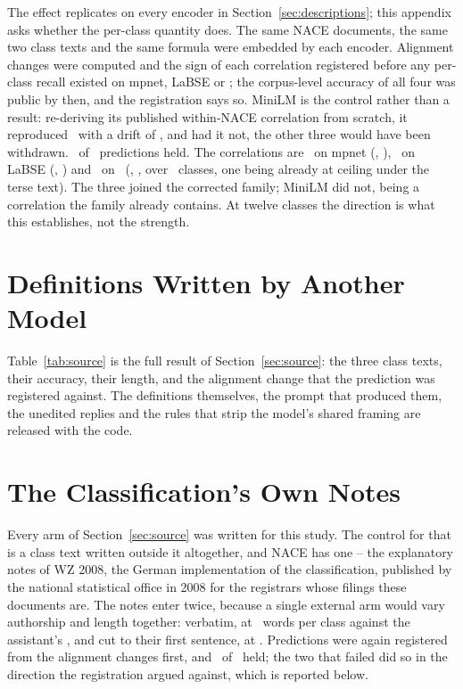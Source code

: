 \documentclass[11pt]{article}
\begin{document}
The effect replicates on every encoder in Section~\ref{sec:descriptions}; this
appendix asks whether the per-class quantity does. The same NACE documents,
the same two class texts and the same formula were embedded by each encoder.
Alignment changes were computed and the sign of each correlation registered
before any per-class recall existed on mpnet, LaBSE or \BgeModel; the
corpus-level accuracy of all four was public by then, and the registration
says so. MiniLM is the control rather than a result: re-deriving its published
within-NACE correlation from scratch, it reproduced \MechMinilmRho\ with a
drift of \MechControlDrift, and had it not, the other three would have been
withdrawn. \MechHeld\ of \MechPredictions\ predictions held. The correlations
are \MechMpnetRho\ on mpnet (\MechMpnetPStat, \HolmMechMpnetStat),
\MechLabseRho\ on LaBSE (\MechLabsePStat, \HolmMechLabseStat) and \MechBgeRho\
on \BgeModel\ (\MechBgePStat, \HolmMechBgeStat, over \MechBgeN\ classes, one
being already at ceiling under the terse text). The three joined the corrected
family; MiniLM did not, being a correlation the family already contains. At
twelve classes the direction is what this establishes, not the strength.

\section{Definitions Written by Another Model}
\label{app:source}

Table~\ref{tab:source} is the full result of Section~\ref{sec:source}: the
three class texts, their accuracy, their length, and the alignment change that
the prediction was registered against. The definitions themselves, the prompt
that produced them, the unedited replies and the rules that strip the model's
shared framing are released with the code.



\section{The Classification's Own Notes}
\label{app:official}

Every arm of Section~\ref{sec:source} was written for this study. The control
for that is a class text written outside it altogether,
and NACE has one -- the explanatory notes of WZ 2008, the German implementation
of the classification, published by the national statistical office in 2008 for
the registrars whose filings these documents are. The notes enter twice, because
a single external arm would vary authorship and length together: verbatim, at
\OfficialFullWords\ words per class against the assistant's
\OfficialAssistantWords, and cut to their first sentence, at
\OfficialSentenceWords. Predictions were again registered from the alignment
changes first, and \OfficialHeld\ of \OfficialPredictions\ held; the two that
failed did so in the direction the registration argued against, which is
reported below.
\end{document}
